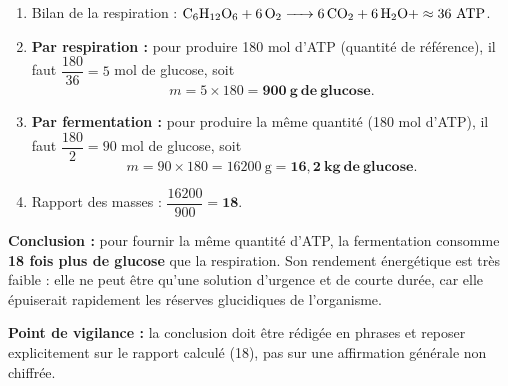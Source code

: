 \documentclass[11pt]{article}
\begin{document}
\begin{corrige}
\begin{enumerate}
\item Bilan de la respiration : $\ce{C6H12O6 + 6 O2 -> 6 CO2 + 6 H2O} + \approx 36\ \text{ATP}$.
\item \textbf{Par respiration :} pour produire \num{180} mol d'ATP (quantité de référence), il faut $\dfrac{\num{180}}{36} = 5$ mol de glucose, soit
\[ m = 5 \times 180 = \mathbf{900\ g\ de\ glucose}. \]
\item \textbf{Par fermentation :} pour produire la même quantité (\num{180} mol d'ATP), il faut $\dfrac{\num{180}}{2} = 90$ mol de glucose, soit
\[ m = 90 \times 180 = \num{16200}\ \text{g} = \mathbf{16,2\ kg\ de\ glucose}. \]
\item Rapport des masses : $\dfrac{\num{16200}}{900} = \mathbf{18}$.
\end{enumerate}
\textbf{Conclusion :} pour fournir la même quantité d'ATP, la fermentation consomme \textbf{18 fois plus de glucose} que la respiration. Son rendement énergétique est très faible : elle ne peut être qu'une solution d'urgence et de courte durée, car elle épuiserait rapidement les réserves glucidiques de l'organisme.

\textbf{Point de vigilance :} la conclusion doit être rédigée en phrases et reposer explicitement sur le rapport calculé (18), pas sur une affirmation générale non chiffrée.
\end{corrige}
\end{document}
